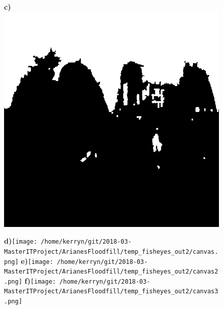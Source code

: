 \documentclass{article}
\begin{document}
\begin{figure}
\textbf{\scriptsize{c)}}\includegraphics[scale=0.20]{Images/2/FloodfillOutput.png}

\textbf{\scriptsize{d)}}\texttt{[image: /home/kerryn/git/2018-03-MasterITProject/ArianesFloodfill/temp\_fisheyes\_out2/canvas.png]}
\textbf{\scriptsize{e)}}\texttt{[image: /home/kerryn/git/2018-03-MasterITProject/ArianesFloodfill/temp\_fisheyes\_out2/canvas2.png]}
\textbf{\scriptsize{f)}}\texttt{[image: /home/kerryn/git/2018-03-MasterITProject/ArianesFloodfill/temp\_fisheyes\_out2/canvas3.png]}

\end{figure} 
\clearpage
\end{document}
